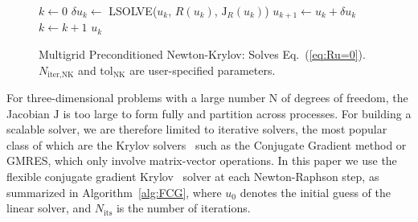 %
\begin{figure}
\begin{algorithm}[H]
  \caption{\label{alg:newtonraphson}
    Multigrid Preconditioned Newton-Krylov: Solves Eq.~(\ref{eq:Ru=0}).$N_{\text{iter,NK}}$ and $\text{tol}_{\text{NK}}$ are user-specified parameters.
 }
    \begin{algorithmic}[1]
      \State $k \leftarrow 0$
       \State  $\delta u_k\leftarrow $ LSOLVE($u_k$, $R(u_k)$, $\mathrm{J}_R(u_k)$) 
       \State $u_{k+1} \leftarrow u_k + \delta u_k$
       \State $k \leftarrow k + 1$
       \EndWhile
       \State \Return $u_{k}$
      \EndProcedure 
    \end{algorithmic}
\end{algorithm}
\end{figure}

For three-dimensional problems with a large number $\mathrm{N}$ of
degrees of freedom, the Jacobian $\mathrm{J}$ is too large to form fully and partition across processes. For
building a scalable solver, we are therefore limited to iterative
solvers, the most popular class of which are the Krylov
solvers~\cite{saad2003iterative} such as the Conjugate Gradient method or GMRES,
which only involve matrix-vector operations. In this paper we use the
flexible conjugate gradient Krylov~\cite{notay2000flexible} solver at each
Newton-Raphson step, as summarized in Algorithm~\ref{alg:FCG}, where
$u_0$ denotes the initial guess of the linear solver, and
$N_{\text{its}}$ is the number of iterations.

